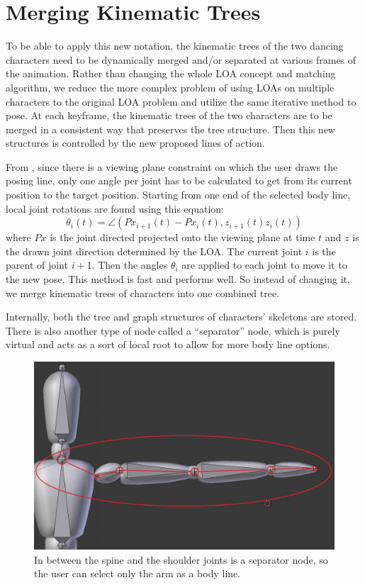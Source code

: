\newpage

\section{Merging Kinematic Trees}
To be able to apply this new notation, the kinematic trees of the two dancing characters need to be dynamically merged and/or separated at various frames of the animation. Rather than changing the whole LOA concept and matching algorithm, we reduce the more complex problem of using LOAs on multiple characters to the original LOA problem and utilize the same iterative method to pose. At each keyframe, the kinematic trees of the two characters are to be merged in a consistent way that preserves the tree structure. Then this new structures is controlled by the new proposed lines of action.

From \citep{guay2015space}, since there is a viewing plane constraint on which the user draws the posing line, only one angle per joint has to be calculated to get from its current position to the target position. Starting from one end of the selected body line, local joint rotations are found using this equation:
\begin{equation}\label{eq:matching}
\theta_i(t) = \angle (Px_{i+1}(t) - Px_i(t), z_{i+1}(t)z_i(t)) 
\end{equation}
where $Px$ is the joint directed projected onto the viewing plane at time $t$ and $z$ is the drawn joint direction determined by the LOA. The current joint $i$ is the parent of joint $i+1$. Then the angles $\theta_i$ are applied to each joint to move it to the new pose. This method is fast and performs well. So instead of changing it, we merge kinematic trees of characters into one combined tree. 

Internally, both the tree and graph structures of characters' skeletons are stored. There is also another type of node called a ``separator'' node, which is purely virtual and acts as a sort of local root to allow for more body line options.

\begin{figure}[H]
\centering
\includegraphics[scale=0.3]{img/shoulder}
\caption{In between the spine and the shoulder joints is a separator node, so the user can select only the arm as a body line.}
\end{figure}

